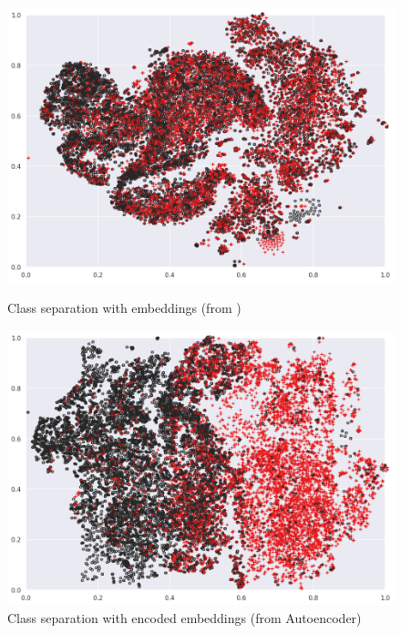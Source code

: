 \begin{figure}[htbp]

\begin{minipage}[t]{0.49\linewidth}
    \includegraphics[width=\linewidth]{chapters/identification/Images/tsne_gc.png}
    \caption{Class separation with embeddings (from \GCB{})}
    \label{embonly}
\end{minipage} 
    \hfill%
\begin{minipage}[t]{0.49\linewidth}
    \includegraphics[width=\linewidth]{chapters/identification/Images/tsne_ae_1.png}
    \caption{Class separation with encoded embeddings (from Autoencoder)}
    \label{encodedemb}
\end{minipage}%

\end{figure}


